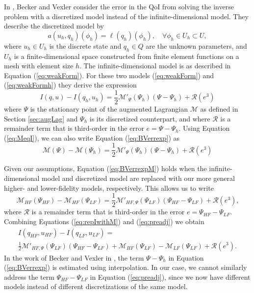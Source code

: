 In \cite{BecVex05}, Becker and Vexler consider the error in the QoI from solving the inverse problem with a discretized model instead of the infinite-dimensional model. They describe the discretized model by
\begin{equation}
a(u_h,q_h)(\phi_h)=\ell(q_h)(\phi_h),\quad\forall\phi_h\in U_h\subset U,
\label{eq:weakFormh}
\end{equation}
where $u_h\in U_h$ is the discrete state and $q_h\in Q$ are the unknown parameters, and $U_h$ is a finite-dimensional space constructed from finite element functions on a mesh with element size $h$. The infinite-dimensional model is as described in Equation (\ref{eq:weakForm}). For these two models (\ref{eq:weakForm}) and (\ref{eq:weakFormh}) they derive the expression
\begin{equation}
I(q,u)-I(q_h,u_h)=\frac{1}{2}\mathcal{M}'_\Psi(\Psi_h)(\Psi-\Psi_h)+\mathcal{R}(e^3)
\label{eq:BVerrexp}
\end{equation}
where $\Psi$ is the stationary point of the augmented Lagrangian $\mathcal{M}$ as defined in Section \ref{sec:augLag} and $\Psi_h$ is its discretized counterpart, and where $\mathcal{R}$ is a remainder term that is third-order in the error $e=\Psi-\Psi_h$. Using Equation (\ref{eq:MeqI}), we can also write Equation (\ref{eq:BVerrexp}) as
\begin{equation}
\mathcal{M}(\Psi)-\mathcal{M}(\Psi_h)=\frac{1}{2}\mathcal{M}'_\Psi(\Psi_h)(\Psi-\Psi_h)+\mathcal{R}(e^3)
\label{eq:BVerrexpM}
\end{equation}

Given our assumptions, Equation (\ref{eq:BVerrexpM}) holds when the infinite-dimensional model and discretized model are replaced with our more general higher- and lower-fidelity models, respectively. This allows us to write
\begin{equation}
\mathcal{M}_{HF}(\Psi_{HF})-\mathcal{M}_{HF}(\Psi_{LF}) = \frac{1}{2}\mathcal{M}'_{HF,\Psi}(\Psi_{LF})(\Psi_{HF}-\Psi_{LF})+\mathcal{R}(e^3)\textrm{,}
\end{equation}
where $\mathcal{R}$ is a remainder term that is third-order in the error $e=\Psi_{HF}-\Psi_{LF}$. Combining Equations (\ref{eq:repIwithM}) and (\ref{eq:preadj}) we obtain
\begin{multline}
I(q_{HF},u_{HF})-I(q_{LF},u_{LF})=\\\frac{1}{2}\mathcal{M}'_{HF,\Psi}(\Psi_{LF})(\Psi_{HF}-\Psi_{LF})+\mathcal{M}_{HF}(\Psi_{LF})-\mathcal{M}_{LF}(\Psi_{LF})+\mathcal{R}(e^3)\textrm{.}
\label{eq:preadj}
\end{multline}
In the work of Becker and Vexler in \cite{BecVex05}, the term $\Psi-\Psi_h$ in Equation (\ref{eq:BVerrexp}) is estimated using interpolation. In our case, we cannot similarly address the term $\Psi_{HF}-\Psi_{LF}$ in Equation (\ref{eq:preadj}), since we now have different models instead of different discretizations of the same model.

